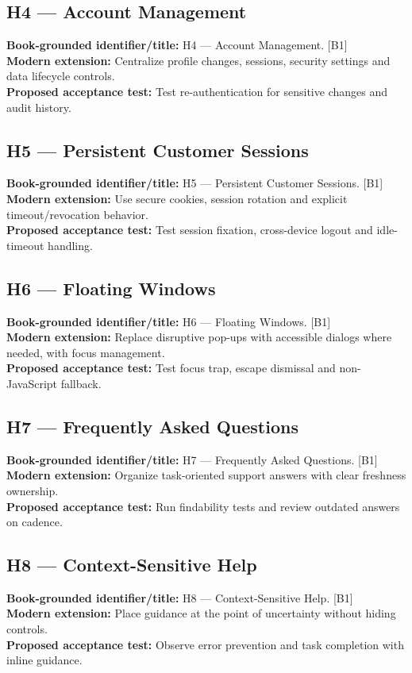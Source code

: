 \documentclass[11pt]{article}
\begin{document}
\subsection{H4 — Account Management}
\noindent\textcolor{Ocean}{\textbf{Book-grounded identifier/title:}} H4 — Account Management. [B1]\\
\textcolor{Mint}{\textbf{Modern extension:}} Centralize profile changes, sessions, security settings and data lifecycle controls.\\
\textcolor{Amber}{\textbf{Proposed acceptance test:}} Test re-authentication for sensitive changes and audit history.\medskip
\subsection{H5 — Persistent Customer Sessions}
\noindent\textcolor{Ocean}{\textbf{Book-grounded identifier/title:}} H5 — Persistent Customer Sessions. [B1]\\
\textcolor{Mint}{\textbf{Modern extension:}} Use secure cookies, session rotation and explicit timeout/revocation behavior.\\
\textcolor{Amber}{\textbf{Proposed acceptance test:}} Test session fixation, cross-device logout and idle-timeout handling.\medskip
\subsection{H6 — Floating Windows}
\noindent\textcolor{Ocean}{\textbf{Book-grounded identifier/title:}} H6 — Floating Windows. [B1]\\
\textcolor{Mint}{\textbf{Modern extension:}} Replace disruptive pop-ups with accessible dialogs where needed, with focus management.\\
\textcolor{Amber}{\textbf{Proposed acceptance test:}} Test focus trap, escape dismissal and non-JavaScript fallback.\medskip
\subsection{H7 — Frequently Asked Questions}
\noindent\textcolor{Ocean}{\textbf{Book-grounded identifier/title:}} H7 — Frequently Asked Questions. [B1]\\
\textcolor{Mint}{\textbf{Modern extension:}} Organize task-oriented support answers with clear freshness ownership.\\
\textcolor{Amber}{\textbf{Proposed acceptance test:}} Run findability tests and review outdated answers on cadence.\medskip
\subsection{H8 — Context-Sensitive Help}
\noindent\textcolor{Ocean}{\textbf{Book-grounded identifier/title:}} H8 — Context-Sensitive Help. [B1]\\
\textcolor{Mint}{\textbf{Modern extension:}} Place guidance at the point of uncertainty without hiding controls.\\
\textcolor{Amber}{\textbf{Proposed acceptance test:}} Observe error prevention and task completion with inline guidance.\medskip
\end{document}
